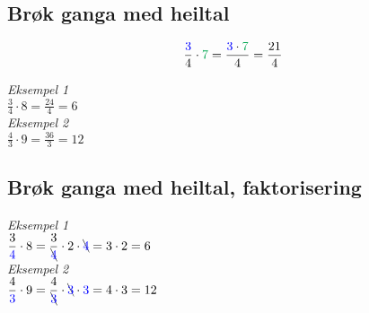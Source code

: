



\subsection*{Brøk ganga med heiltal}
\[ \frac{\colb{3}}{4}\cdot \colg{7}=\frac{\colb{3}\cdot\colg{7}}{4}=\frac{21}{4} \]



\vsk
\textit{Eksempel 1} \\[5pt]
$ \displaystyle \frac{3}{4}\cdot 8 = \frac{24}{4}=6 $ \\[10pt]

\textit{Eksempel 2} \\[5pt]
$ \displaystyle \frac{4}{3}\cdot9 = \frac{36}{3}=12 $


\subsection*{Brøk ganga med heiltal, faktorisering}
\textit{Eksempel 1} \\[5pt]
$ \displaystyle \frac{3}{{\color{blue} 4}}\cdot 8 = \frac{3}{\bcancel{{\color{blue} 4}}}\cdot 2\cdot \bcancel{{\color{blue} 4}}=3\cdot2=6$ \\[10pt]

\textit{Eksempel 2} \\[5pt]
$ \displaystyle \frac{4}{{\color{blue} 3}}\cdot9 = \frac{4}{\bcancel{{\color{blue} 3}}}\cdot \bcancel{{\color{blue} 3}}\cdot{\color{blue} 3} =4\cdot3=12 $


